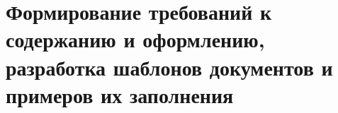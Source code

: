 
\pagebreak
\section{Формирование требований к содержанию и оформлению, разработка шаблонов документов и примеров их заполнения}